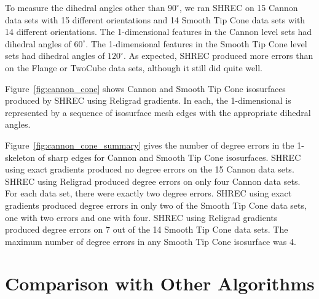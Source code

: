 To measure the dihedral angles other than $90^\circ$,
we ran SHREC on 15 Cannon data sets with 15 different orientations
and 14 Smooth Tip Cone data sets with 14 different orientations.
The 1-dimensional features in the Cannon level sets
had dihedral angles of $60^\circ$.
The 1-dimensional features in the Smooth Tip Cone level sets
had dihedral angles of $120^\circ$.
As expected, SHREC produced more errors than on the Flange or TwoCube
data sets, although it still did quite well.

Figure~\ref{fig:cannon_cone} shows Cannon and Smooth Tip Cone isosurfaces
produced by SHREC using Religrad gradients.
In each, the 1-dimensional is represented by a sequence 
of isosurface mesh edges with the appropriate dihedral angles.

Figure~\ref{fig:cannon_cone_summary} gives the number of degree errors
in the 1-skeleton of sharp edges
for Cannon and Smooth Tip Cone isosurfaces.
SHREC using exact gradients produced no degree errors 
on the 15 Cannon data sets.
SHREC using Religrad produced degree errors on only four Cannon data sets.
For each data set, there were exactly two degree errors.
SHREC using exact gradients produced degree errors in only two 
of the Smooth Tip Cone data sets,
one with two errors and one with four.
SHREC using Religrad gradients produced degree errors on 7 out of the 14
Smooth Tip Cone data sets.
The maximum number of degree errors in any Smooth Tip Cone isosurface
was 4.


\section{Comparison with Other Algorithms}
\label{section:comparison}
